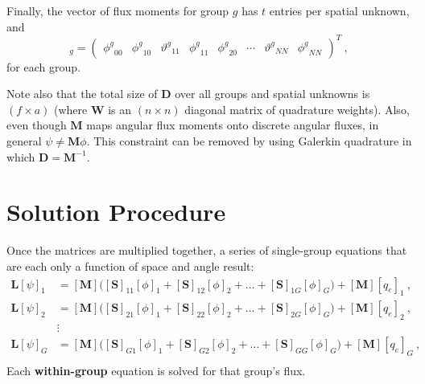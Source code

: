 \documentclass[12pt]{article}
\newcommand{\ve}[1]{\ensuremath{\mathbf{#1}}}
\newcommand{\even}{\ensuremath{\phi^g}}
\newcommand{\odd}{\ensuremath{\vartheta^g}}
\begin{document}
Finally, the
vector of flux moments for group $g$ has $t$ entries per spatial unknown, and
%
\begin{equation} 
[\phi]_g = \begin{pmatrix} \even_{00} & \even_{10} & \odd_{11}
& \even_{11} & \even_{20} & \cdots & \odd_{NN} & \even_{NN}
  \end{pmatrix}^T\:,
\end{equation} for each group.

Note also that the total size of $\ve{D}$ over all
groups and spatial unknowns is $(f\times a)$ (where $\ve{W}$ is an $(n\times n)$ diagonal matrix of quadrature
weights).  Also, even though $\ve{M}$ maps
angular flux moments onto discrete angular fluxes, in general
$\psi\ne\ve{M}\phi$.  This constraint can be removed by using Galerkin
quadrature in which $\ve{D} = \ve{M}^{-1}$.


\section*{Solution Procedure}
Once the matrices are multiplied together, a series of single-group equations that are each only a function of space and angle result:
%
\begin{equation}
  \begin{aligned}
    \ve{L}[\psi]_1 &= [\ve{M}]\bigl([\ve{S}]_{11}[\phi]_1 + 
    [\ve{S}]_{12}[\phi]_2 + \ldots + [\ve{S}]_{1G}[\phi]_G\bigr) + 
    [\ve{M}][q_{e}]_1\:, \\
    \ve{L}[\psi]_2 &= [\ve{M}]\bigl([\ve{S}]_{21}[\phi]_1 + 
    [\ve{S}]_{22}[\phi]_2 + \ldots + [\ve{S}]_{2G}[\phi]_G\bigr) + 
    [\ve{M}][q_{e}]_2\:, \\
    &\vdots\\
    \ve{L}[\psi]_G &= [\ve{M}]\bigl([\ve{S}]_{G1}[\phi]_1 + 
    [\ve{S}]_{G2}[\phi]_2 + \ldots + [\ve{S}]_{GG}[\phi]_G\bigr) + 
       [\ve{M}][q_{e}]_G\:, \\
  \end{aligned}
  \label{eq:group-equations}
\end{equation}
%
Each \textbf{within-group} equation is solved for that group's flux. 
\end{document}

